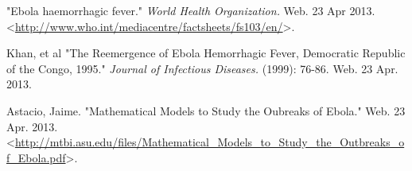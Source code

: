 \documentclass[twoside]{article}
\begin{document}
\begin{thebibliography}{99} %

 "Ebola haemorrhagic fever." {\em World Health Organization.}
		Web. 23 Apr 2013. <\url{http://www.who.int/mediacentre/factsheets/fs103/en/}>.
	
 Khan, et al "The Reemergence of Ebola Hemorrhagic Fever, Democratic Republic of the Congo, 1995."
	{\em Journal of Infectious Diseases.} (1999): 76-86. Web. 23 Apr. 2013.

 Astacio, Jaime. "Mathematical Models to Study the Oubreaks of Ebola." Web. 23 Apr. 2013.
		<\url{http://mtbi.asu.edu/files/Mathematical_Models_to_Study_the_Outbreaks_of_Ebola.pdf}>.

\end{thebibliography}

\end{document}
